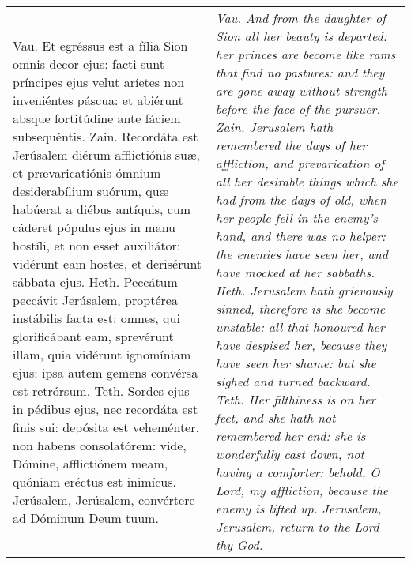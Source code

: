 \begin{tabular}{p{8cm} | p{8cm}}
Vau. Et egréssus est a fília Sion omnis decor ejus: facti sunt príncipes ejus velut aríetes non inveniéntes páscua: et abiérunt absque fortitúdine ante fáciem subsequéntis.
Zain. Recordáta est Jerúsalem diérum afflictiónis suæ, et prævaricatiónis ómnium desiderabílium suórum, quæ habúerat a diébus antíquis, cum cáderet pópulus ejus in manu hostíli, et non esset auxiliátor: vidérunt eam hostes, et derisérunt sábbata ejus.
Heth. Peccátum peccávit Jerúsalem, proptérea instábilis facta est: omnes, qui glorificábant eam, sprevérunt illam, quia vidérunt ignomíniam ejus: ipsa autem gemens convérsa est retrórsum.
Teth. Sordes ejus in pédibus ejus, nec recordáta est finis sui: depósita est veheménter, non habens consolatórem: vide, Dómine, afflictiónem meam, quóniam eréctus est inimícus.
Jerúsalem, Jerúsalem, convértere ad Dóminum Deum tuum.
& \textit{Vau. And from the daughter of Sion all her beauty is departed: her princes are become like rams that find no pastures: and they are gone away without strength before the face of the pursuer.
Zain. Jerusalem hath remembered the days of her affliction, and prevarication of all her desirable things which she had from the days of old, when her people fell in the enemy's hand, and there was no helper: the enemies have seen her, and have mocked at her sabbaths.
Heth. Jerusalem hath grievously sinned, therefore is she become unstable: all that honoured her have despised her, because they have seen her shame: but she sighed and turned backward.
Teth. Her filthiness is on her feet, and she hath not remembered her end: she is wonderfully cast down, not having a comforter: behold, O Lord, my affliction, because the enemy is lifted up.
Jerusalem, Jerusalem, return to the Lord thy God.}
\end{tabular}